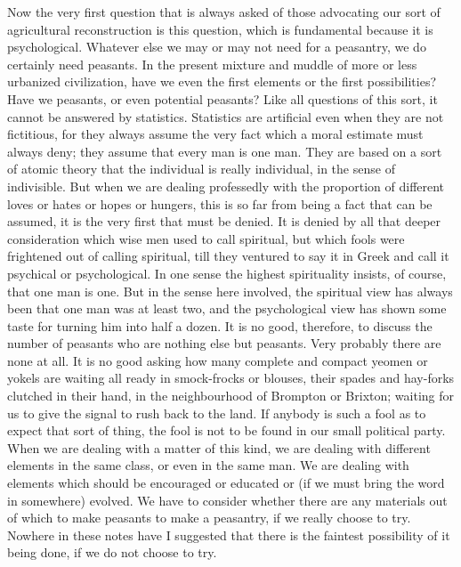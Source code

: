 \documentclass{book}
\begin{document}
Now the very first question that is always asked of those advocating our sort of agricultural reconstruction is this question, which is fundamental because it is psychological. Whatever else we may or may not need for a peasantry, we do certainly need peasants. In the present mixture and muddle of more or less urbanized civilization, have we even the first elements or the first possibilities? Have we peasants, or even potential peasants? Like all questions of this sort, it cannot be answered by statistics. Statistics are artificial even when they are not fictitious, for they always assume the very fact which a moral estimate must always deny; they assume that every man is one man. They are based on a sort of atomic theory that the individual is really individual, in the sense of indivisible. But when we are dealing professedly with the proportion of different loves or hates or hopes or hungers, this is so far from being a fact that can be assumed, it is the very first that must be denied. It is denied by all that deeper consideration which wise men used to call spiritual, but which fools were frightened out of calling spiritual, till they ventured to say it in Greek and call it psychical or psychological. In one sense the highest spirituality insists, of course, that one man is one. But in the sense here involved, the spiritual view has always been that one man was at least two, and the psychological view has shown some taste for turning him into half a dozen. It is no good, therefore, to discuss the number of peasants who are nothing else but peasants. Very probably there are none at all. It is no good asking how many complete and compact yeomen or yokels are waiting all ready in smock-frocks or blouses, their spades and hay-forks clutched in their hand, in the neighbourhood of Brompton or Brixton; waiting for us to give the signal to rush back to the land. If anybody is such a fool as to expect that sort of thing, the fool is not to be found in our small political party. When we are dealing with a matter of this kind, we are dealing with different elements in the same class, or even in the same man. We are dealing with elements which should be encouraged or educated or (if we must bring the word in somewhere) evolved. We have to consider whether there are any materials out of which to make peasants to make a peasantry, if we really choose to try. Nowhere in these notes have I suggested that there is the faintest possibility of it being done, if we do not choose to try.
\end{document}
